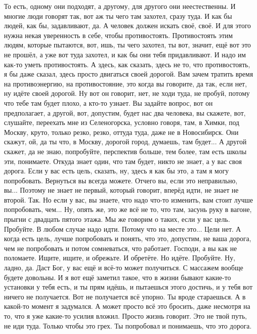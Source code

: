 То есть, одному они подходят, а другому, для другого они неестественны.
И многие люди говорят так, вот аж ты чего там захотел, сразу туда.
И как бы людей, как бы, задавливают, да.
А человек должен искать своё, своё.
И для этого нужна некая уверенность в себе, чтобы противостоять.
Противостоять этим людям, которые пытаются, вот, ишь, ты чего захотел, ты вот, значит, ещё вот это не прошёл, а уже вот туда захотел, и как бы они тебя придавливают.
И надо им как-то уметь противостоять.
А здесь, как сказать, здесь не то, что противостоять, я бы даже сказал, здесь просто двигаться своей дорогой.
Вам зачем тратить время на противоэнергию, на противостояние, это когда вы говорите, да так, если нет, ну идёте своей дорогой.
Ну вот он говорит, нет, не ходи туда, не пробуй, потому что тебе там будет плохо, а кто-то узнает.
Вы задайте вопрос, вот он предполагает, а другой, вот, допустим, будет нас два человека, вы скажете, вот, слушайте, переехать мне из Селеногорска, условно говоря, там, в Химки, под Москву, круто, только резко, резко, оттуда туда, даже не в Новосибирск.
Они скажут, ой, да ты что, в Москву, дорогой город, думаешь, там будет...
А другой скажет, да не знаю, попробуйте, перспектив больше, тем более, там есть школы эти, понимаете.
Откуда знает один, что там будет, никто не знает, а у вас своя дорога.
Если у вас есть цель, сказать, ну, здесь я как бы это, а там я могу попробовать.
Вернуться вы всегда можете.
Отчего вы, если это неправильно, вы...
Поэтому не знает не первый, который говорит, вперёд идти, не знает не второй.
Так.
Но если у вас, вы знаете, что надо что-то изменить, вам стоит лучше попробовать, чем...
Ну, опять же, это же всё не то, что там, засунь руку в вагоне, прыгни с двадцать пятого этажа.
Мы же говорим о таких, если у вас цель.
Пробуйте.
В любом случае надо идти.
Потому что на месте это...
Цели нет.
А когда есть цель, лучше попробовать и понять, что это, допустим, не ваша дорога, чем не попробовать и потом сомневаться, что работает.
Господи, а вы как не поломаете.
Ищите, ищите, и обрежьте.
И обретёте.
Но идёте.
Пробуйте.
Ну, ладно, да.
Даст Бог, у вас ещё и всё-то может получиться.
С массажем вообще будете довольны.
И я вот ещё заметил такое, что в жизни бывают какие-то установки у тебя есть, и ты прям идёшь, и пытаешься этого достичь, и у тебя вот ничего не получается.
Вот не получается всё упорно.
Ты вроде стараешься.
А в какой-то момент я задумался.
А может просто всё это бросить, даже несмотря на то, что я уже какие-то усилия вложил.
Просто жизнь говорит.
Это не твой путь, не иди туда.
Только чтобы это грех.
Ты попробовал и понимаешь, что это дорога.

